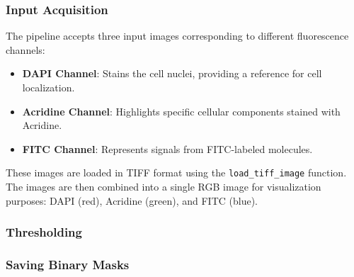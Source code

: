 \documentclass[a4paper,12pt]{article}
\begin{document}
\subsubsection{Input Acquisition}

The pipeline accepts three input images corresponding to different fluorescence channels:
\begin{itemize}
    \item \textbf{DAPI Channel}: Stains the cell nuclei, providing a reference for cell localization.
    \item \textbf{Acridine Channel}: Highlights specific cellular components stained with Acridine.
    \item \textbf{FITC Channel}: Represents signals from FITC-labeled molecules.
\end{itemize}
These images are loaded in TIFF format using the \texttt{load\_tiff\_image} function. The images are then combined into a single RGB image for visualization purposes: DAPI (red), Acridine (green), and FITC (blue).

\subsubsection{Thresholding}


\subsubsection{Saving Binary Masks}

\end{document}
